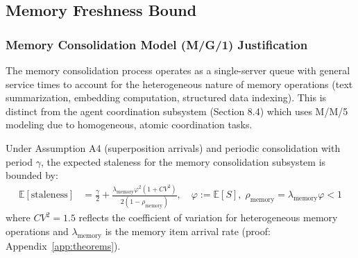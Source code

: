 \documentclass{article}
\begin{document}
\subsection{Memory Freshness Bound}

\subsubsection{Memory Consolidation Model (M/G/1) Justification}

The memory consolidation process operates as a single-server queue with general service times to account for the heterogeneous nature of memory operations (text summarization, embedding computation, structured data indexing). This is distinct from the agent coordination subsystem (Section 8.4) which uses M/M/5 modeling due to homogeneous, atomic coordination tasks.

\begin{theorem}
\label{thm:memory_freshness}
Under Assumption A4 (superposition arrivals) and periodic consolidation with period $\gamma$, the expected staleness for the memory consolidation subsystem is bounded by:
\begin{align}
\mathbb{E}[\text{staleness}] &= \frac{\gamma}{2} + \frac{\lambda_{\text{memory}}\varphi^2(1+CV^2)}{2(1-\rho_{\text{memory}})}, \quad \varphi := \mathbb{E}[S], \; \rho_{\text{memory}} = \lambda_{\text{memory}}\varphi < 1
\end{align}
where $CV^2 = 1.5$ reflects the coefficient of variation for heterogeneous memory operations and $\lambda_{\text{memory}}$ is the memory item arrival rate (proof: Appendix~\ref{app:theorems}).
\end{theorem}
\end{document}
